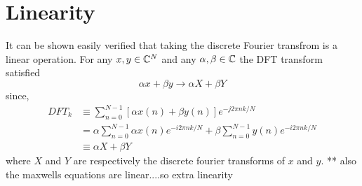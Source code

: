 \section{Linearity} It can be shown easily verified that taking the discrete
Fourier transfrom is a linear operation. For any $x,y \in \mathbb{C}^{N}$ and
any $\alpha,\beta \in \mathbb{C}$ the DFT transform satisfied
$$
\alpha x + \beta y \to \alpha X + \beta Y
$$
since,
\begin{align*} DFT_k &\equiv \sum_{n=0}^{N-1} \left[ \alpha x(n) + \beta y(n)
\right] e^{-j 2 \pi n k / N} \\ &= \alpha \sum_{n=0}^{N-1} \alpha x(n) e ^ {-i 2
\pi n k /N} + \beta \sum_{n=0}^{N-1} y(n) e^{-i 2 \pi n k / N} \\ &\equiv \alpha
X + \beta Y
\end{align*} where $X$ and $Y$ are respectively the discrete fourier transforms
of $x$ and $y$. ** also the maxwells equations are linear....so extra linearity

